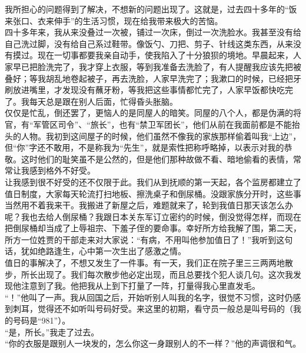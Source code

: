 我所担心的问题得到了解决，不想新的问题出现了。这就是，过去四十多年的“饭来张口、衣来伸手”的生活习惯，现在给我带来极大的苦恼。\\

四十多年来，我从来没叠过一次被，铺过一次床，倒过一次洗脸水。我甚至没有给自己洗过脚，没有给自己系过鞋带。像饭勺、刀把、剪子、针线这类东西，从来没有摸过。现在一切事都要我亲自动手，使我陷入了十分狼狈的境地。早晨起来，人家早已把脸洗完了，我才穿上衣服，等到我准备去洗脸了，有人提醒我应该先把被叠好；等我胡乱地卷起被子，再去洗脸，人家早洗完了；我漱口的时候，已经把牙刷放进嘴里，才发现没有蘸牙粉，等我把这些事情都忙完了，人家早饭都快吃完了。我每天总是跟在别人后面，忙得昏头胀脑。\\

仅仅是忙乱，倒还罢了，更恼人的是同屋人的暗笑。同屋的八个人，都是伪满的将官，有“军管区司令”、“旅长”，也有“禁卫军团长”，他们从前在我面前都是不能抬头的人物。我初到这间屋子的时候，他们虽然不像我的家族那样偷着叫我“上边”，但“你”字还不敢用，不是称我为“先生”，就是索性把称呼略掉，以表示对我的恭敬。这时他们的耻笑虽不是公然的，但是他们那种故做不看、暗地偷看的表情，常常让我感到格外不好受。\\

让我感到很不好受的还不仅限于此。我们从到抚顺的第一天起，各个监房都建立了值日制度，大家每天轮流打扫地板、擦洗桌子和倒尿桶。没跟家族分开时，这些事当然用不着我来干。我搬进了新屋之后，难题就来了，轮到我值日那天该怎么办呢？我也去给人倒尿桶？我跟日本关东军订立密约的时候，倒没觉得怎样，而现在把倒尿桶却当成了上辱祖宗、下羞子侄的要命事。幸好所方给我解了围，第二天，所方一位姓贾的干部走来对大家说：“有病，不用叫他参加值日了！”我听到这句话，犹如绝路逢生，心中第一次生出了感激之情。\\

值日的事解决了，不想又发生了一件事。有一天，我们正在院子里三三两两地散步，所长出现了。我们每次散步他必定出现，而且总要找个犯人谈几句。这次我发现他注意到了我。他把我从上到下打量了一阵，打量得我心里直发毛。\\

“！”他叫了一声。我从回国之后，开始听别人叫我的名字，很觉不习惯，这时仍感到刺耳，觉得还不如听叫号码好受。来这里的初期，看守员一般总是叫号码的（我的号码是“981”）。\\

“是，所长。”我走了过去。\\

“你的衣服是跟别人一块发的，怎么你这一身跟别人的不一样？”他的声调很和气。\\

